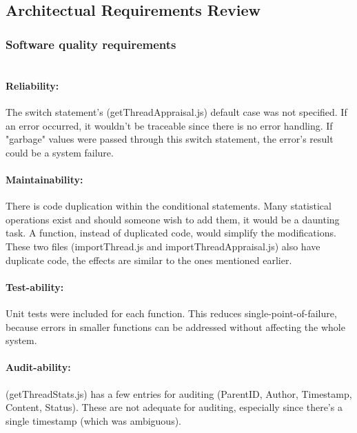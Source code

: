 \subsection{Architectual Requirements Review}

\subsubsection{Software quality requirements} 

\paragraph{\\Reliability:}
The switch statement's (getThreadAppraisal.js) default case was not specified. If an error occurred, it wouldn't be traceable since there is no error handling. If "garbage" values were passed through this switch statement, the error's result could be a system failure.
\par
\paragraph{Maintainability:}
There is code duplication within the conditional statements. Many statistical operations exist and should someone wish to add them, it would be a daunting task. A function, instead of duplicated code, would simplify the modifications. \\
These two files (importThread.js and importThreadAppraisal.js) also have duplicate code, the effects are similar to the ones mentioned earlier.
\par
\paragraph{Test-ability:}
Unit tests were included for each function. This reduces single-point-of-failure, because errors in smaller functions can be addressed without affecting the whole system.
\par
\paragraph {Audit-ability:}
(getThreadStats.js) has a few entries for auditing (ParentID, Author, Timestamp, Content, Status). These are not adequate for auditing, especially since there's a single timestamp (which was ambiguous). \\
\par


